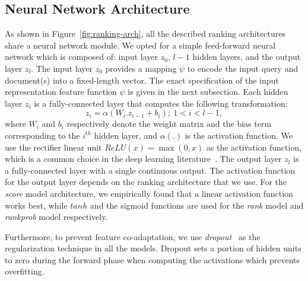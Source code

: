\documentclass[sigconf]{acmart}
\newcommand{\modelone}{\textit{score} model\xspace}
\newcommand{\modeltwo}{\textit{rank} model\xspace}
\newcommand{\modelthree}{\textit{rank\-prob} model\xspace}
\newcommand{\sshrink}{\vspace{-.80ex}}
\begin{document}
\subsection{Neural Network Architecture}
As shown in Figure~\ref{fig:ranking-arch}, all the described ranking architectures share a neural network module. 
%
We opted for a simple feed-forward neural network which is composed of: input layer $z_0$, $l-1$ hidden layers, and the output layer $z_l$. The input layer $z_0$ provides a mapping $\psi$ to encode the input query and document(s) into a fixed-length vector.
The exact specification of the input representation feature function $\psi$ is given in the next subsection. 
Each hidden layer $z_i$ is a fully-connected layer that computes the following transformation:
\begin{equation}
    z_i = \alpha(W_i.z_{i-1} + b_i); ~ 1<i<l-1,
\end{equation}
where $W_i$ and $b_i$ respectively denote the weight matrix and the bias term corresponding to the $i^{th}$ hidden layer, and $\alpha(.)$ is the activation function. We use the rectifier linear unit $\textit{ReLU}(x) = \max(0, x)$ as the activation function, which is a common choice in the deep learning literature~\citep{Lecun:2015}. 
The output layer $z_l$ is a fully-connected layer with a single continuous output. The activation function for the output layer depends on the ranking architecture that we use. For the \modelone architecture, we empirically found that a linear activation function works best, while $tanh$ and the sigmoid functions are used for the \modeltwo and \modelthree respectively.

Furthermore, to prevent feature co-adaptation, we use \emph{dropout}~\citep{Srivastava:2014} as the regularization technique in all the models. Dropout sets a portion of hidden units to zero during the forward phase when computing the activations which prevents overfitting.

%

\sshrink
\end{document}
